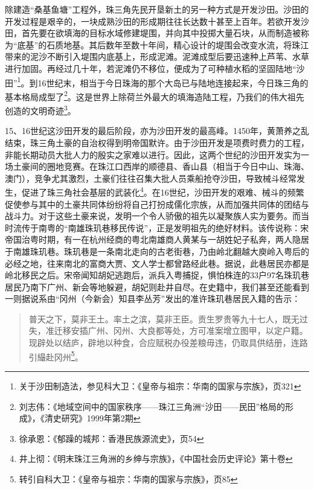 除建造“桑基鱼塘”工程外，珠三角先民开垦新土的另一种方式是开发沙田。沙田的开发过程是艰辛的，一块成熟沙田的形成期往往长达数十甚至上百年。若欲开发沙田，首先要在欲填海的目标水域修建堤围，并向其中投掷大量石块，从而制造被称为“底基”的石质地基。其后数年至数十年间，精心设计的堤围会改变水流，将珠江带来的泥沙不断引入堤围内底基上，形成泥滩。泥滩成型后要迅速种上芦苇、水草进行加固。再经过几十年，若泥滩仍不移位，便成为了可种植水稻的坚固陆地“沙田”\footnote{关于沙田制造法，参见科大卫：《皇帝与祖宗：华南的国家与宗族》，页321}。到16世纪末，相当于今日珠海的那个大岛已与陆地连接起来，今日珠三角的基本格局成型了\footnote{刘志伟：《地域空间中的国家秩序——珠江三角洲“沙田——民田”格局的形成》，《清史研究》1999年第2期}。这是世界上除荷兰外最大的填海造陆工程，乃我们的伟大祖先创造的文明奇迹\footnote{徐承恩：《郁躁的城邦：香港民族源流史》，页54}。

15、16世纪这沙田开发的最后阶段，亦为沙田开发的最高峰。1450年，黄萧养之乱结束，珠三角土豪的自治权得到明帝国默许。由于沙田开发是项费时费力的工程，非能长期动员大批人力的殷实之家难以进行。因此，这两个世纪的沙田开发实为一场土豪间的圈地竞赛。在珠江口西岸的顺德县、香山县（相当于今日中山、珠海、澳门），竞争尤其激烈，土豪们往往召集大批人员乘船抢夺沙田，导致械斗经常发生，促进了珠三角社会基层的武装化\footnote{井上彻：《明末珠江三角洲的乡绅与宗族》，《中国社会历史评论》第十卷}。在16世纪，沙田开发的艰难、械斗的频繁促使参与其中的土豪共同体纷纷将自己打扮成儒化宗族，从而加强共同体的团结与战斗力。对于这些土豪来说，发明一个令人骄傲的祖先以凝聚族人实为要务。而当时流传于南粤的“南雄珠玑巷移民传说”，正是发明祖先的绝好材料。该传说称：宋帝国治粤时期，有一在杭州经商的粤北南雄商人黄某与一胡姓妃子私奔，两人隐居于南雄珠玑巷。珠玑巷是一条南北走向的古老街巷，乃由岭北翻越大庾岭入粤后的必经之地，往来南北的富商大贾、文人学士都曾路经此巷。据说，此巷居民亦都是岭北移民之后。宋帝闻知胡妃逃跑后，派兵入粤捕捉，惧怕株连的33户97名珠玑巷居民乃南下广州、新会等地躲避，胡妃则赴井自尽。在史籍中，我们甚至还能看到一则据说系由“冈州（今新会）知县李丛芳”发出的准许珠玑巷居民入籍的告示：

\begin{quote}
	

普天之下，莫非王土。率土之滨，莫非王臣。贡生罗贵等九十七人，既无过失，准迁移安插广州、冈州、大良都等处，方可准案增立图甲，以定户籍。现辟处以结庐，辟地以种食，合应赋税办役差粮毋违，仍取具供结册，连路引繓赴冈州\footnote{转引自科大卫：《皇帝与祖宗：华南的国家与宗族》，页85}。

\end{quote}

